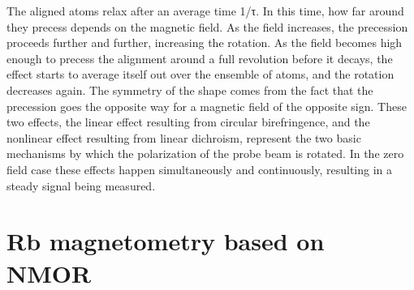 The aligned atoms relax after an average time 1/τ. In this time, how far around they precess depends on the magnetic field. As the field increases, the precession proceeds further and further, increasing the rotation. As the field becomes high enough to precess the alignment around a full revolution before it decays, the effect starts to average itself out over the ensemble of atoms, and the rotation decreases again. The symmetry of the shape comes from the fact that the precession goes the opposite way for a magnetic field of the opposite sign.
These two effects, the linear effect resulting from circular birefringence, and the nonlinear effect resulting from linear dichroism, represent the two basic mechanisms by which the polarization of the probe beam is rotated. In the zero field case these effects happen simultaneously and continuously, resulting in a steady signal being measured.


\section{Rb magnetometry based on NMOR}

